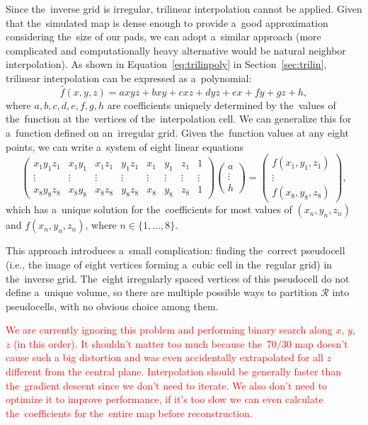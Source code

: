 			Since the~inverse grid is irregular, trilinear interpolation cannot be applied. Given that the~simulated map is dense enough to provide a~good approximation considering the~size of our pads, we can adopt a~similar approach (more complicated and computationally heavy alternative would be natural neighbor interpolation). As shown in Equation~\ref{eq:trilinpoly} in Section~\ref{sec:trilin}, trilinear interpolation can be expressed as a~polynomial:
				\begin{equation}
					\widehat{f}(x,y,z) = axyz + bxy + cxz + dyz + ex + fy + gz + h,
				\end{equation}
			where $a,b,c,d,e,f,g,h$ are coefficients uniquely determined by the~values of the~function at the~vertices of the~interpolation cell. We can generalize this for a~function defined on an~irregular grid. Given the~function values at any eight points, we can write a~system of eight linear equations
				\begin{equation}
					\begin{pmatrix}
						x_1 y_1 z_1 & x_1 y_1 & x_1 z_1 & y_1 z_1 & x_1 & y_1 & z_1 & 1\\
						\vdots & \vdots & \vdots & \vdots & \vdots & \vdots & \vdots & \vdots\\
						x_8 y_8 z_8 & x_8 y_8 & x_8 z_8 & y_8 z_8 & x_8 & y_8 & z_8 & 1
					\end{pmatrix}
					\begin{pmatrix}
						a\\
						\vdots\\
						h
					\end{pmatrix}
					=
					\begin{pmatrix}
						f(x_1,y_1,z_1)\\
						\vdots\\
						f(x_8,y_8,z_8)
					\end{pmatrix},
				\end{equation}
			which has a~unique solution for the~coefficients for most values of $(x_n, y_n, z_n)$ and $f(x_n,y_n,z_n)$, where $n\in\{1,\ldots,8\}$.
			
			This approach introduces a~small complication: finding the~correct pseudocell (i.e., the image of eight vertices forming a~cubic cell in the~regular grid) in the~inverse grid. The~eight irregularly spaced vertices of this pseudocell do not define a~unique volume, so there are multiple possible ways to partition $\mathcal{R}$ into pseudocells, with no obvious choice among them.
			
			\textcolor{red}{We are currently ignoring this problem and performing binary search along $x$, $y$, $z$ (in this order). It shouldn't matter too much because the~70/30 map doesn't cause such a big distortion and was even accidentally extrapolated for all $z$ different from the central plane.}
			\textcolor{red}{Interpolation should be generally faster than the~gradient descent since we don't need to iterate. We also don't need to optimize it to improve performance, if it's too slow we can even calculate the~coefficients for the~entire map before reconstruction.}
			
